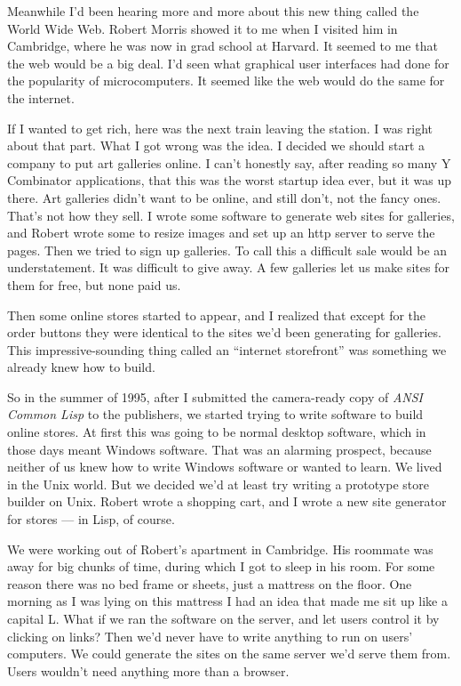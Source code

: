\documentclass[12pt]{book}
\begin{document}
Meanwhile I'd been hearing more and more about this new thing called the
World Wide Web. Robert Morris showed it to me when I visited him in
Cambridge, where he was now in grad school at Harvard. It seemed to me
that the web would be a big deal. I'd seen what graphical user
interfaces had done for the popularity of microcomputers. It seemed like
the web would do the same for the internet.

If I wanted to get rich, here was the next train leaving the station. I
was right about that part. What I got wrong was the idea. I decided we
should start a company to put art galleries online. I can't honestly
say, after reading so many Y Combinator applications, that this was the
worst startup idea ever, but it was up there. Art galleries didn't want
to be online, and still don't, not the fancy ones. That's not how they
sell. I wrote some software to generate web sites for galleries, and
Robert wrote some to resize images and set up an http server to serve
the pages. Then we tried to sign up galleries. To call this a difficult
sale would be an understatement. It was difficult to give away. A few
galleries let us make sites for them for free, but none paid us.

Then some online stores started to appear, and I realized that except
for the order buttons they were identical to the sites we'd been
generating for galleries. This impressive-sounding thing called an
``internet storefront'' was something we already knew how to build.

So in the summer of 1995, after I submitted the camera-ready copy of
\emph{ANSI Common Lisp} to the publishers, we started trying to write
software to build online stores. At first this was going to be normal
desktop software, which in those days meant Windows software. That was
an alarming prospect, because neither of us knew how to write Windows
software or wanted to learn. We lived in the Unix world. But we decided
we'd at least try writing a prototype store builder on Unix. Robert
wrote a shopping cart, and I wrote a new site generator for stores ---
in Lisp, of course.

We were working out of Robert's apartment in Cambridge. His roommate was
away for big chunks of time, during which I got to sleep in his room.
For some reason there was no bed frame or sheets, just a mattress on the
floor. One morning as I was lying on this mattress I had an idea that
made me sit up like a capital L. What if we ran the software on the
server, and let users control it by clicking on links? Then we'd never
have to write anything to run on users' computers. We could generate the
sites on the same server we'd serve them from. Users wouldn't need
anything more than a browser.
\end{document}
